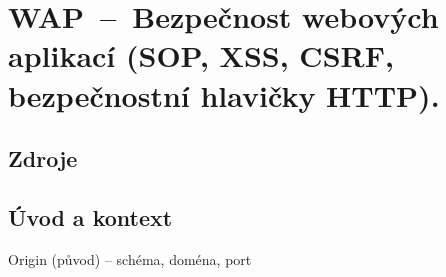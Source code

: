 

\graphicspath{{wap/udalosti_v_javascriptu/figures}}


\chapter{WAP~--~Bezpečnost webových aplikací (SOP, XSS, CSRF, bezpečnostní hlavičky HTTP).}


\section{Zdroje}

\begin{compactitem}
    \item {}
\end{compactitem}


\section{Úvod a kontext}

\begin{compactitem}
    \item {}
\end{compactitem}


Origin (původ) -- schéma, doména, port
